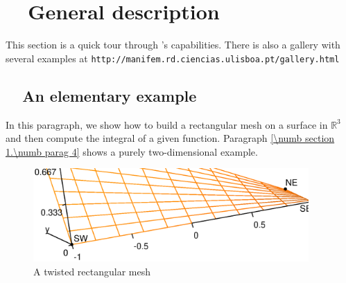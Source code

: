 
\chapter{~~General description}\label{\numb section 1}

This section is a quick tour through \maniFEM's capabilities.
There is also a gallery with several examples at
{\small\tt http://manifem.rd.ciencias.ulisboa.pt/gallery.html}


\section{~~An elementary example}\label{\numb section 1.\numb parag 1}

In this paragraph, we show how to build a rectangular mesh on a surface in $ \mathbb{R}^3 $ 
and then compute the integral of a given function.
Paragraph \ref{\numb section 1.\numb parag 4} shows a purely two-dimensional example.

\begin{figure} \centering
  \includegraphics[width=105mm]{3d-rectangle}
  \caption{A twisted rectangular mesh}
  \label{\numb section 1.\numb fig 1}
\end{figure}

